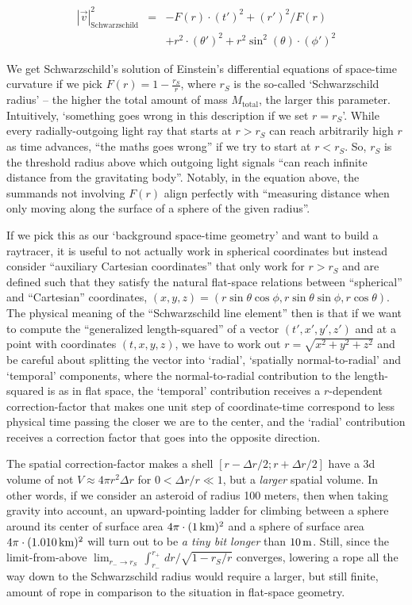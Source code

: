 \documentclass[twocolumn]{article}
\begin{document}
\begin{equation}
  \begin{array}{lcl}
    |\vec v|^2_\text{Schwarzschild}&=&-F(r)\cdot (t')^2 + (r')^2/F(r)\\
    &&+ r^2\cdot(\theta')^2+r^2\sin^2(\theta)\cdot(\phi')^2
  \end{array}
\end{equation}

We get Schwarzschild's solution of Einstein's differential equations
of space-time curvature if we pick $F(r)=1-\frac{r_S}{r}$, where $r_S$
is the so-called `Schwarzschild radius' -- the higher the total amount
of mass $M_\text{total}$, the larger this parameter. Intuitively,
`something goes wrong in this description if we set $r=r_S$'. While
every radially-outgoing light ray that starts at $r>r_S$ can reach
arbitrarily high $r$ as time advances, ``the maths goes wrong'' if we
try to start at $r<r_S$. So, $r_S$ is the threshold radius above which
outgoing light signals ``can reach infinite distance from the
gravitating body''. Notably, in the equation above, the summands not
involving $F(r)$ align perfectly with ``measuring distance when only
moving along the surface of a sphere of the given radius''.

If we pick this as our `background space-time geometry' and want to
build a raytracer, it is useful to not actually work in spherical
coordinates but instead consider ``auxiliary Cartesian coordinates''
that only work for $r>r_S$ and are defined such that they satisfy the
natural flat-space relations between ``spherical'' and ``Cartesian''
coordinates, $(x,y,z)=(r\sin\theta\cos\phi, r\sin\theta\sin\phi,
r\cos\theta)$. The physical meaning of the ``Schwarzschild line
element'' then is that if we want to compute the ``generalized
length-squared'' of a vector $(t',x',y',z')$ and at a point with
coordinates $(t, x, y, z)$, we have to work out $r=\sqrt{x^2+y^2+z^2}$
and be careful about splitting the vector into `radial', `spatially
normal-to-radial' and `temporal' components, where the
normal-to-radial contribution to the length-squared is as in flat
space, the `temporal' contribution receives a $r$-dependent
correction-factor that makes one unit step of coordinate-time
correspond to less physical time passing the closer we are to the
center, and the `radial' contribution receives a correction factor
that goes into the opposite direction.

The spatial correction-factor makes a shell $[r-\Delta r/2; r+\Delta
r/2]$ have a 3d volume of not $V\approx 4\pi r^2\Delta r$ for
$0<\Delta r/r\ll 1$, but a \emph{larger} spatial volume. In other
words, if we consider an asteroid of radius 100 meters, then when
taking gravity into account, an upward-pointing ladder for climbing
between a sphere around its center of surface area $4\pi\cdot (1\,{\rm
km})^2$ and a sphere of surface area $4\pi\cdot (1.010\,{\rm km})^2$
will turn out to be \emph{a tiny bit longer} than $10\,{\rm
m}$. Still, since the limit-from-above $\lim_{r_-\to
r_S}\,\int_{r_-}^{r_+}\,dr/\sqrt{1-r_S/r}$ converges, lowering a rope
all the way down to the Schwarzschild radius would require a larger,
but still finite, amount of rope in comparison to the situation in
flat-space geometry.
\end{document}
